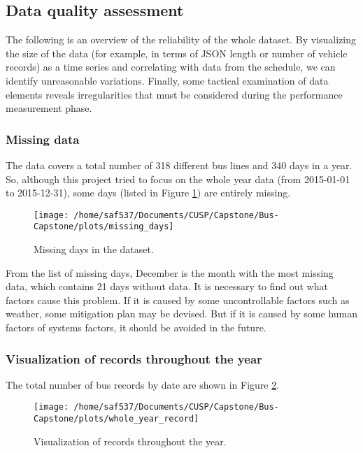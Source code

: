 \documentclass[12pt,journal,compsoc]{IEEEtran}
\begin{document}
\vspace{0.5cm}


\subsection{Data quality assessment}

The following is an overview of the reliability of the whole dataset. By visualizing the size of the data (for example, in terms of JSON length or number of vehicle records) as a time series and correlating with data from the schedule, we can identify unreasonable variations.  Finally, some tactical examination of data elements reveals irregularities that must be considered during the performance measurement phase.

\subsubsection*{Missing data}

The data covers a total number of 318 different bus lines and 340 days in a year. So, although this project tried to focus on the whole year data (from 2015-01-01 to 2015-12-31), some days (listed in Figure \ref{m_days}) are entirely missing.
  

\begin{figure}[!t]
\centering
\texttt{[image: /home/saf537/Documents/CUSP/Capstone/Bus-Capstone/plots/missing\_days]}
\caption{Missing days in the dataset.}
\label{m_days}
\end{figure}



From the list of missing days, December is the month with the most missing data, which contains 21 days without data. It is necessary to find out what factors cause this problem. If it is caused by some uncontrollable factors such as weather, some mitigation plan may be devised. But if it is caused by some human factors of systems factors, it should be avoided in the future.
      
\subsubsection*{Visualization of records throughout the year}
      
The total number of bus records by date are shown in Figure \ref{m_alldays}.



\begin{figure}[!t]
  \caption{Visualization of records throughout the year.}
  \label{m_alldays}
  \centering
    \texttt{[image: /home/saf537/Documents/CUSP/Capstone/Bus-Capstone/plots/whole\_year\_record]}
\end{figure}
\end{document}
